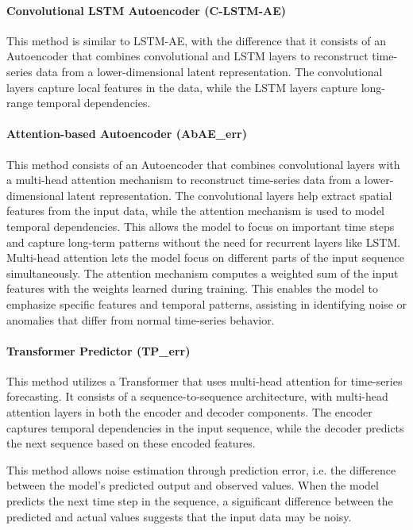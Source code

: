 \documentclass[conference]{IEEEtran}
\begin{document}
\paragraph{Convolutional LSTM Autoencoder (C-LSTM-AE)} This method is similar to LSTM-AE, with the difference that it consists of an Autoencoder that combines convolutional and LSTM layers to reconstruct time-series data from a lower-dimensional latent representation. The convolutional layers capture local features in the data, while the LSTM layers capture long-range temporal dependencies. 
\paragraph{Attention-based Autoencoder (AbAE\_err)} This method consists of an Autoencoder that combines convolutional layers with a multi-head attention mechanism to reconstruct time-series data from a lower-dimensional latent representation. The convolutional layers help extract spatial features from the input data, while the attention mechanism is used to model temporal dependencies. This allows the model to focus on important time steps and capture long-term patterns without the need for recurrent layers like LSTM. Multi-head attention lets the model focus on different parts of the input sequence simultaneously. The attention mechanism computes a weighted sum of the input features with the weights learned during training. This enables the model to emphasize specific features and temporal patterns, assisting in identifying noise or anomalies that differ from normal time-series behavior.
\paragraph{Transformer Predictor (TP\_err)} This method utilizes a Transformer that uses multi-head attention for time-series forecasting. It consists of a sequence-to-sequence architecture, with multi-head attention layers in both the encoder and decoder components. The encoder captures temporal dependencies in the input sequence, while the decoder predicts the next sequence based on these encoded features. 

This method allows noise estimation through prediction error, i.e. the difference between the model's predicted output and observed values. When the model predicts the next time step in the sequence, a significant difference between the predicted and actual values suggests that the input data may be noisy. 
\end{document}
